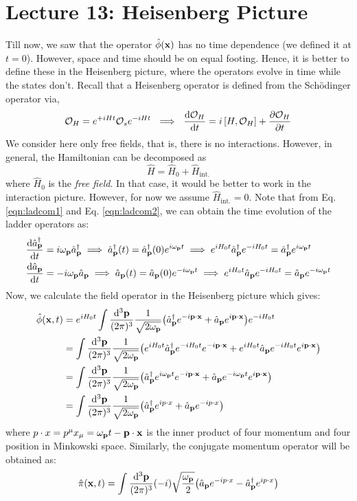 \section*{Lecture 13: Heisenberg Picture}
Till now, we saw that the operator $\hat{\phi}(\vb{x})$ has no time dependence (we defined it at $t=0$). However, space and time should be on equal footing. Hence, it is better to define these in the Heisenberg picture, where the operators evolve in time while the states don't. Recall that a Heisenberg operator is defined from the Sch\"odinger operator via,
$$\mathcal{O}_H = e^{+iHt}\mathcal{O}_s e^{-iHt} \ \implies \ \dv{\mathcal{O}_H}{t} = i \comtr{H}{\mathcal{O}_H} + \pdv{\mathcal{O}_H}{t}$$
We consider here only free fields, that is, there is no interactions. However, in general, the Hamiltonian can be decomposed as $$\hat{H} = \hat{H}_0+ \hat{H}_{\mathrm{int.}}$$
where $\hat{H}_0$ is the \textit{free field}. In that case, it would be better to work in the interaction picture. However, for now we assume  $\hat{H}_{\mathrm{int.}} =0$. 
Note that from Eq. \ref{eqn:ladcom1} and Eq. \ref{eqn:ladcom2}, we can obtain the time evolution of the ladder operators as: 
\begin{align*}
   \dv{\hat{a}_{\vb{p}}^\dagger}{t} &= i\omega_{\vb{{p}}} \hat{a}_{\vb{p}}^\dagger \implies \hat{a}_{\vb{p}}^\dagger(t) = \hat{a}_{\vb{p}}^\dagger(0)e^{i\omega_{\vb{{p}}} t}\implies e^{iH_0t}\hat{a}_{\vb{p}}^\dagger e^{-iH_0t} = \hat{a}_{\vb{p}}^\dagger e^{i\omega_{\vb{{p}}} t}\\
   \dv{\hat{a}_{\vb{p}}}{t} &= -i\omega_{\vb{{p}}} \hat{a}_{\vb{p}} \implies \hat{a}_{\vb{p}}(t) = \hat{a}_{\vb{p}}(0)e^{-i\omega_{\vb{{p}}} t}\implies e^{iH_0t}\hat{a}_{\vb{p}} e^{-iH_0t} = \hat{a}_{\vb{p}} e^{-i\omega_{\vb{{p}}} t}
\end{align*}
Now, we calculate the field operator in the Heisenberg picture which gives:
\begin{align*}
    \hat{\phi}(\vb{x},t) &= e^{iH_0t} \int \frac{\dd^3\vb{{\vb{p}}}}{(2\pi)^3}\frac{1}{\sqrt{2\omega_{\vb{{p}}}}}\qty(\hat{a}_{\vb{p}}^\dagger e^{-i \vb{p}\cdot \vb{x}}+\hat{a}_{\vb{p}} e^{i \vb{p}\cdot \vb{x}}) e^{-iH_0t}\\
    &= \int \frac{\dd^3\vb{{\vb{p}}}}{(2\pi)^3}\frac{1}{\sqrt{2\omega_{\vb{{p}}}}}\qty(e^{iH_0t}\hat{a}_{\vb{p}}^\dagger e^{-iH_0t} e^{-i \vb{p}\cdot \vb{x}}+e^{iH_0t}\hat{a}_{\vb{p}} e^{-iH_0t} e^{i \vb{p}\cdot \vb{x}}) \\
    &=\int \frac{\dd^3\vb{{\vb{p}}}}{(2\pi)^3}\frac{1}{\sqrt{2\omega_{\vb{{p}}}}}\qty(\hat{a}_{\vb{p}}^\dagger e^{i\omega_{\vb{{p}}} t} e^{-i \vb{p}\cdot \vb{x}}+\hat{a}_{\vb{p}} e^{-i\omega_{\vb{{p}}} t} e^{i \vb{p}\cdot \vb{x}})\\
    &=\int \frac{\dd^3\vb{{\vb{p}}}}{(2\pi)^3}\frac{1}{\sqrt{2\omega_{\vb{{p}}}}}\qty(\hat{a}_{\vb{p}}^\dagger e^{i p\cdot x}+\hat{a}_{\vb{p}} e^{-i p\cdot x})
\end{align*}
where $p\cdot x = p^\mu x_\mu = \omega_{\vb{{p}}} t - \vb{p}\cdot \vb{x}$ is the inner product of four momentum and four position in Minkowski space. Similarly, the conjugate momentum operator will be obtained as:
$$ \hat{\pi}(\vb{x},t) = \int \frac{\dd^3\vb{{\vb{p}}}}{(2\pi)^3}(-i)\sqrt{\frac{\omega_{\vb{{p}}}}{2}}\qty(\hat{a}_{\vb{p}} e^{-i p\cdot x}-\hat{a}_{\vb{p}}^\dagger e^{i p\cdot x})$$